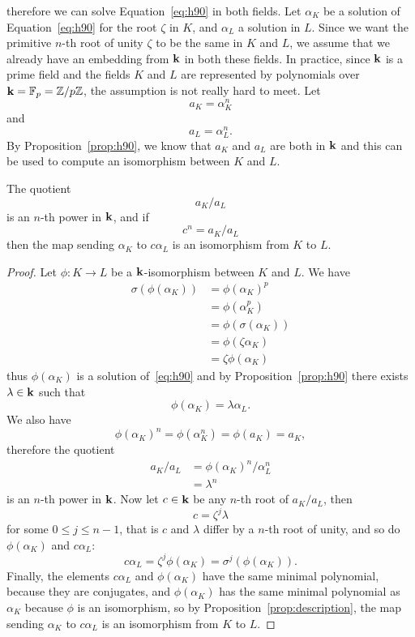 therefore we can solve Equation~\eqref{eq:h90} in both fields. Let $\alpha_K$ be a
solution of Equation~\eqref{eq:h90} for the root $\zeta$ in $K$, and $\alpha_L$
a solution in $L$. Since we want the primitive $n$-th root of unity $\zeta$ to
be the same in $K$ and $L$, we assume that we already have an embedding from
$\mathbf{k}$ in both these fields. In practice, since $\mathbf{k}$ is a
prime field and the fields $K$ and $L$ are represented by polynomials over
$\mathbf{k} = \mathbb{F}_p=\mathbb{Z}/p\mathbb{Z}$, the assumption is not really
hard to meet. Let
\[
  a_K = \alpha_K^n
\]
and
\[
  a_L = \alpha_L^n.
\]
By Proposition~\ref{prop:h90}, we know that $a_K$ and $a_L$ are both in $\mathbf{k}$ and
this can be used to compute an isomorphism between $K$ and $L$.
\begin{prop}
  \label{prop:allombert-simple}
 The quotient
 \[
   a_K/a_L
 \]
 is an $n$-th power in $\mathbf{k}$, and if
 \[
   c^n = a_K/a_L
 \]
 then the map sending $\alpha_K$ to $c\alpha_L$ is an isomorphism from $K$ to $L$.
\end{prop}
\begin{proof}
  Let $\phi:K\to L$ be a $\mathbf{k}$-isomorphism between $K$ and $L$. We have
  \begin{align*}
    \sigma(\phi(\alpha_K)) &= \phi(\alpha_K)^p\\
    &= \phi(\alpha_K^p)\\
    &= \phi(\sigma(\alpha_K))\\
    &= \phi(\zeta\alpha_K)\\
    &= \zeta\phi(\alpha_K)
  \end{align*}
  thus $\phi(\alpha_K)$ is a solution of~\eqref{eq:h90} and by
  Proposition~\ref{prop:h90} there exists $\lambda\in\mathbf{k}$ such that
  \[
    \phi(\alpha_K) = \lambda\alpha_L.
  \]
  We also have
  \[
    \phi(\alpha_K)^n = \phi(\alpha_K^n) = \phi(a_K) = a_K,
  \]
  therefore the quotient
  \begin{align*}
    a_K/a_L &= \phi(\alpha_K)^n/\alpha_L^n\\
    &= \lambda^{n}
  \end{align*}
  is an $n$-th power in $\mathbf{k}$. Now let $c\in\mathbf{k}$ be any $n$-th root of $a_K/a_L$,
  then
  \[
    c = \zeta^j\lambda
  \]
  for some $0\leq j\leq n-1$, that is $c$ and $\lambda$ differ by a $n$-th root
  of unity, and so do $\phi(\alpha_K)$ and $c\alpha_L$:
  \[
    c\alpha_L = \zeta^j\phi(\alpha_K) = \sigma^j(\phi(\alpha_K)).
  \]
  Finally, the elements $c\alpha_L$ and $\phi(\alpha_K)$ have the same minimal
  polynomial, because they are conjugates, and $\phi(\alpha_K)$ has the same
  minimal polynomial as $\alpha_K$ because $\phi$ is an isomorphism, so by
  Proposition~\ref{prop:description}, the map sending $\alpha_K$ to $c\alpha_L$ is an
  isomorphism from $K$ to $L$.
\end{proof}
